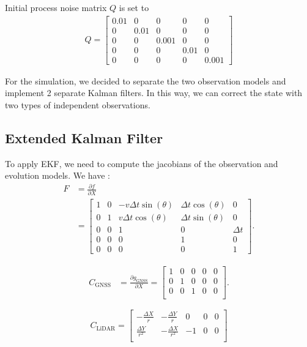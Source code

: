 \documentclass[conference]{IEEEtran}
\begin{document}
\noindent Initial process noise matrix $Q$ is set to
\begin{align*}
   Q = \begin{bmatrix}
    0.01 & 0 & 0 & 0 & 0 \\ 
    0 & 0.01 & 0 & 0 & 0 \\
    0 & 0 & 0.001 & 0 & 0 \\
    0 & 0 & 0 & 0.01 & 0 \\
    0 & 0 & 0 & 0 & 0.001
    \end{bmatrix}
\end{align*}

\noindent For the simulation, we decided to separate the two observation models and implement 2 separate Kalman filters. In this way, we can correct the state with two types of independent observations.

\subsection{Extended Kalman Filter}

To apply EKF, we need to compute the jacobians of the observation and evolution models. We have :
\begin{align*}
    F &= \frac{\partial f}{\partial X} \\ 
    &=
    \begin{bmatrix}
    1 & 0 & -v \Delta t \sin(\theta) & \Delta t \cos(\theta) & 0 \\
    0 & 1 & v \Delta t \cos(\theta) & \Delta t \sin(\theta) & 0 \\
    0 & 0 & 1 & 0 & \Delta t \\
    0 & 0 & 0 & 1 & 0 \\
    0 & 0 & 0 & 0 & 1
    \end{bmatrix}.
\end{align*}

\begin{align*}
    C_{\text{GNSS}} &= \frac{\partial g_\text{GNSS}}{\partial X} =
    \begin{bmatrix}
    1 & 0 & 0 & 0 & 0\\
    0 & 1 & 0 & 0 & 0\\
    0 & 0 & 1 & 0 & 0\\
    \end{bmatrix}.
\end{align*}

\[
C_{\text{LiDAR}} =
\begin{bmatrix}
-\frac{\Delta X}{r} & -\frac{\Delta Y}{r} & 0 & 0 & 0 \\
\frac{\Delta Y}{r^2} & -\frac{\Delta X}{r^2} & -1 & 0 & 0 \\
\end{bmatrix}
\]
\end{document}
